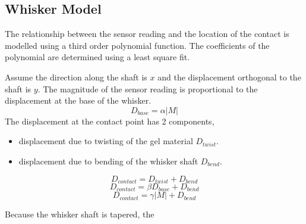 \documentclass{article}
\begin{document}
\subsection{Whisker Model}

The relationship between the sensor reading and the location of the contact is modelled using a third order polynomial function. The coefficients of the polynomial are determined using a least square fit.



Assume the direction along the shaft is \(x\) and the displacement orthogonal to the shaft is \(y\).
The magnitude of the sensor reading is proportional to the displacement at the base of the whisker.
    \[D_{base} = \alpha |M| \]
The displacement at the contact point has 2 components,
\begin{itemize}
    \item displacement due to twisting of the gel material \(D_{twist}\).
    \item displacement due to bending of the whisker shaft \(D_{bend}\).
\end{itemize}
    \[D_{contact} = D_{twist} + D_{bend}\]
    \[D_{contact} = \beta D_{base} + D_{bend}\]
    \[D_{contact} = \gamma |M| + D_{bend}\]

Because the whisker shaft is tapered, the 
\end{document}
